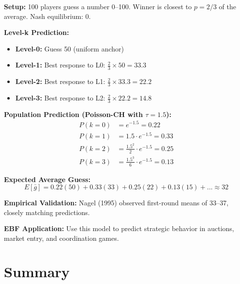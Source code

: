\begin{tcolorbox}[colback=green!5!white, colframe=green!75!black,
    title=Example: Predicting Behavior in p=2/3 Game]

\textbf{Setup:}
100 players guess a number 0--100. Winner is closest to $p=2/3$ of the average. Nash equilibrium: 0.

\textbf{Level-k Prediction:}
\begin{itemize}
    \item \textbf{Level-0:} Guess 50 (uniform anchor)
    \item \textbf{Level-1:} Best response to L0: $\frac{2}{3} \times 50 = 33.3$
    \item \textbf{Level-2:} Best response to L1: $\frac{2}{3} \times 33.3 = 22.2$
    \item \textbf{Level-3:} Best response to L2: $\frac{2}{3} \times 22.2 = 14.8$
\end{itemize}

\textbf{Population Prediction (Poisson-CH with $\tau = 1.5$):}
\begin{align}
P(k=0) &= e^{-1.5} = 0.22 \\
P(k=1) &= 1.5 \cdot e^{-1.5} = 0.33 \\
P(k=2) &= \frac{1.5^2}{2} \cdot e^{-1.5} = 0.25 \\
P(k=3) &= \frac{1.5^3}{6} \cdot e^{-1.5} = 0.13
\end{align}

\textbf{Expected Average Guess:}
\begin{equation}
E[\bar{g}] = 0.22(50) + 0.33(33) + 0.25(22) + 0.13(15) + ... \approx 32
\end{equation}

\textbf{Empirical Validation:}
Nagel (1995) observed first-round means of 33--37, closely matching predictions.

\textbf{EBF Application:}
Use this model to predict strategic behavior in auctions, market entry, and coordination games.

\end{tcolorbox}

\section{Summary}

